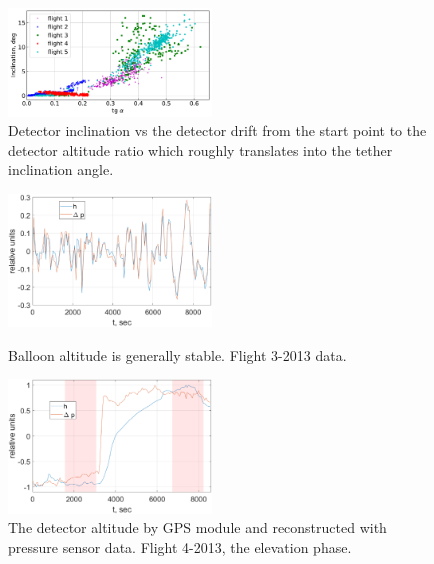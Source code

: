 \documentclass[final,5p,times,twocolumn]{elsarticle}
\begin{document}
\begin{figure}[tb]
\includegraphics[width=0.48\textwidth]{figs/tg-inclination.pdf}
\caption{Detector inclination vs the detector drift from the start point to the detector altitude ratio which roughly translates into the tether inclination angle.}
\label{fig:drift-inclination}
\end{figure}

\begin{figure}[t]
    \includegraphics[width=0.48\textwidth]{figs/good_corr.eps}
    \caption{Balloon altitude is generally stable. Flight 3-2013 data.}
    \label{fig:dp-h-good}
    \vspace{1pc}

    \includegraphics[width=0.48\textwidth]{figs/bad_corr.eps}
    \caption{The detector altitude by GPS module and reconstructed with pressure sensor data. Flight 4-2013, the elevation phase.}
    \label{fig:dp-h-bad}
\end{figure}
\end{document}
